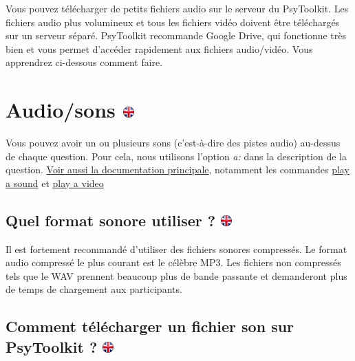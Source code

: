 \documentclass[
]{book}
\begin{document}
Vous pouvez télécharger de petits fichiers audio sur le serveur du
PsyToolkit. Les fichiers audio plus volumineux et tous les fichiers
vidéo doivent être téléchargés sur un serveur séparé. PsyToolkit
recommande Google Drive, qui fonctionne très bien et vous permet
d'accéder rapidement aux fichiers audio/vidéo. Vous apprendrez
ci-dessous comment faire.

\hypertarget{audiosons}{%
\section[Audio/sons ]{\texorpdfstring{Audio/sons
\href{https://www.psytoolkit.org/lessons/surveyaudiovideo.html\#_audio_sound}{\protect\includegraphics{img/ukflag.png}}}{Audio/sons }}\label{audiosons}}

Vous pouvez avoir un ou plusieurs sons (c'est-à-dire des pistes audio)
au-dessus de chaque question. Pour cela, nous utilisons l'option
\emph{a:} dans la description de la question.
\protect\hyperlink{s8}{Voir aussi la documentation principale},
notamment les commandes \protect\hyperlink{playasound}{play a sound} et
\protect\hyperlink{playavideo}{play a video}

\hypertarget{quel-format-sonore-utiliser}{%
\subsection[Quel format sonore utiliser ? ]{\texorpdfstring{Quel format
sonore utiliser ?
\href{https://www.psytoolkit.org/lessons/surveyaudiovideo.html\#_what_sound_format_to_use}{\protect\includegraphics{img/ukflag.png}}}{Quel format sonore utiliser ? }}\label{quel-format-sonore-utiliser}}

Il est fortement recommandé d'utiliser des fichiers sonores compressés.
Le format audio compressé le plus courant est le célèbre MP3. Les
fichiers non compressés tels que le WAV prennent beaucoup plus de bande
passante et demanderont plus de temps de chargement aux participants.

\hypertarget{comment-tuxe9luxe9charger-un-fichier-son-sur-psytoolkit}{%
\subsection[Comment télécharger un fichier son sur PsyToolkit ?
]{\texorpdfstring{Comment télécharger un fichier son sur PsyToolkit ?
\href{https://www.psytoolkit.org/lessons/surveyaudiovideo.html\#_how_to_upload_a_sound_file_to_psytoolkit}{\protect\includegraphics{img/ukflag.png}}}{Comment télécharger un fichier son sur PsyToolkit ? }}\label{comment-tuxe9luxe9charger-un-fichier-son-sur-psytoolkit}}
\end{document}
